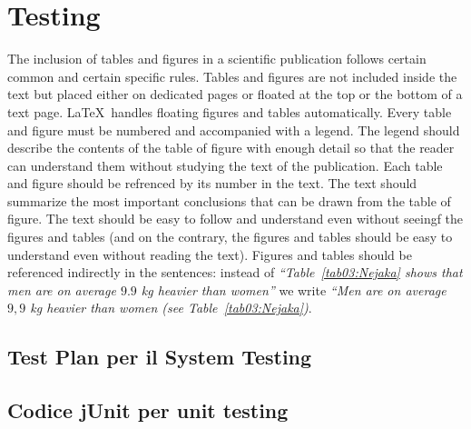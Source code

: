%
%	 
%

\chapter{Testing}

The inclusion of tables and figures in a scientific publication follows
certain common and certain specific rules. Tables and figures are not
included inside the text but placed either on dedicated pages or floated
at the top or the bottom of a text page. \LaTeX\ handles floating
figures and tables automatically. Every table and figure must be
numbered and accompanied with a legend. The legend should describe the
contents of the table of figure with enough detail so that the reader
can understand them without studying the text of the publication. Each
table and figure should be refrenced by its number in the text. The
text should summarize the most important conclusions that can be drawn
from the table of figure. The text should be easy to follow and
understand even without seeingf the figures and tables (and on the
contrary, the figures and tables should be easy to understand even
without reading the text). Figures and tables should be referenced
indirectly in the sentences: instead of
\emph{``Table~\ref{tab03:Nejaka} shows that men are on average $9.9$
  kg heavier than women''} we write \emph{``Men are on average $9,9$
  kg heavier than women (see Table~\ref{tab03:Nejaka})}.


\section{Test Plan per il System Testing}

\section{Codice jUnit per unit testing}